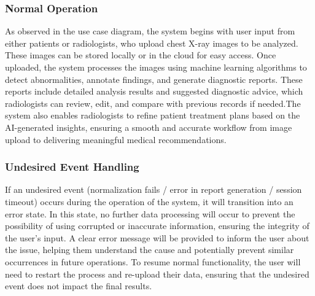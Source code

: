 \documentclass[12pt]{article}
\begin{document}
\subsubsection{Normal Operation}
As observed in the use case diagram, the system begins with user input from either patients or radiologists, who upload chest X-ray images to be analyzed. These images can be stored locally or in the cloud for easy access. Once uploaded, the system processes the images using machine learning algorithms to detect abnormalities, annotate findings, and generate diagnostic reports. These reports include detailed analysis results and suggested diagnostic advice, which radiologists can review, edit, and compare with previous records if needed.The system also enables radiologists to refine patient treatment plans based on the AI-generated insights, ensuring a smooth and accurate workflow from image upload to delivering meaningful medical recommendations.
\subsubsection{Undesired Event Handling}
If an undesired event (normalization fails / error in report generation / session timeout) occurs during the operation of the system, it will transition into an error state. In this state, no further data processing will occur to prevent the possibility of using corrupted or inaccurate information, ensuring the integrity of the user's input. A clear error message will be provided to inform the user about the issue, helping them understand the cause and potentially prevent similar occurrences in future operations. To resume normal functionality, the user will need to restart the process and re-upload their data, ensuring that the undesired event does not impact the final results.
\end{document}
